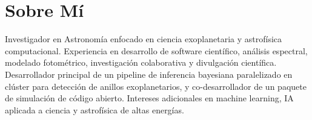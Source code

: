 \section*{Sobre Mí}
Investigador en Astronomía enfocado en ciencia exoplanetaria y astrofísica computacional. Experiencia en desarrollo de software científico, análisis espectral, modelado fotométrico, investigación colaborativa y divulgación científica. Desarrollador principal de un pipeline de inferencia bayesiana paralelizado en clúster para detección de anillos exoplanetarios, y co-desarrollador de un paquete de simulación de código abierto. Intereses adicionales en machine learning, IA aplicada a ciencia y astrofísica de altas energías.
